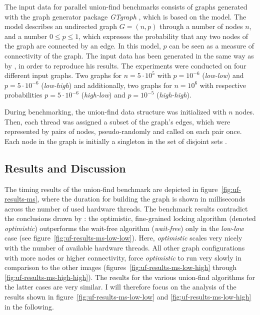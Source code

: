 The input data for parallel union-find benchmarks consists of graphs generated
with the graph generator package \emph{GTgraph} \cite{MadduriGTgraph}, which is
based on the \citet{Erdos1959Random} model. The \citet{Erdos1959Random} model
describes an undirected graph $G = (n, p)$ through a number of nodes $n$, and a
number $0 \leq p \leq 1$, which expresses the probability that any two nodes of
the graph are connected by an edge. In this model, $p$ can be seen as a measure
of connectivity of the graph. The input data has been generated in the same way
as by \citet{Berman2010Multicore}, in order to reproduce his results. The
experiments were conducted on four different input graphs. Two graphs for $n = 5
\cdot 10^5$ with $p = 10^{-6}$ (\emph{low-low}) and $p = 5\cdot 10^{-6}$
(\emph{low-high}) and additionally, two graphs for $n = 10^6$ with respective
probabilities $p = 5 \cdot 10^{-6}$ (\emph{high-low}) and $p = 10^{-5}$
(\emph{high-high}).

During benchmarking, the union-find data structure was initialized with $n$
nodes. Then, each thread was assigned a subset of the graph's edges, which were
represented by pairs of nodes, pseudo-randomly and called  on
each pair once. Each node in the graph is initially a singleton in the set of
disjoint sets \cite{Berman2010Multicore}.

\subsection{Results and Discussion}
\label{sec:experiments-uf-results}

The timing results of the union-find benchmark are depicted in
figure~\ref{fig:uf-results-ms}, where the duration for building the graph is
shown in milliseconds across the number of used hardware threads. The benchmark
results contradict the conclusions drawn by \citet{Berman2010Multicore}: the
optimistic, fine-grained locking algorithm (denoted \emph{optimistic})
outperforms the wait-free algorithm (\emph{wait-free}) only in the
\emph{low-low} case (see figure~\ref{fig:uf-results-ms-low-low}). Here,
\emph{optimistic} scales very nicely with the number of available hardware
threads. All other graph configurations with more nodes or higher connectivity,
force \emph{optimistic} to run very slowly in comparison to the other images
(figures~\ref{fig:uf-results-ms-low-high} through
\ref{fig:uf-results-ms-high-high}). The results for the various union-find
algorithms for the latter cases are very similar. I will therefore focus on the
analysis of the results shown in figure~\ref{fig:uf-results-ms-low-low} and
\ref{fig:uf-results-ms-low-high} in the following.


